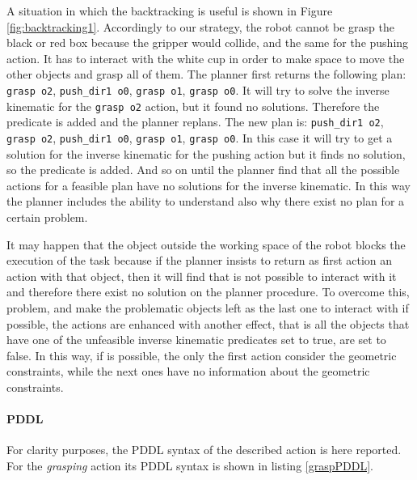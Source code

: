A situation in which the backtracking is useful is shown in Figure \ref{fig:backtracking1}. Accordingly to our strategy, the robot cannot be grasp the black or red box because the gripper would collide, and the same for the pushing action. It has to interact with the white cup in order to make space to move the other objects and grasp all of them. The planner first returns the following plan: \texttt{grasp o2}, \texttt{push\_dir1 o0}, \texttt{grasp o1}, \texttt{grasp o0}. It will try to solve the inverse kinematic for the \texttt{grasp o2} action, but it found no solutions. Therefore the predicate  is added and the planner replans. The new plan is: \texttt{push\_dir1 o2}, \texttt{grasp o2}, \texttt{push\_dir1 o0}, \texttt{grasp o1}, \texttt{grasp o0}. In this case it will try to get a solution for the inverse kinematic for the pushing action but it finds no solution, so the predicate  is added. And so on until the planner find that all the possible actions for a feasible plan have no solutions for the inverse kinematic. In this way the planner includes the ability to understand also why there exist no plan for a certain problem. 




It may happen that the object outside the working space of the robot blocks the execution of the task because if the planner insists to return as first action an action with that object, then it will find that is not possible to interact with it and therefore there exist no solution on the planner procedure. 
To overcome this, problem, and make the problematic objects left as the last one to interact with if possible, the actions are enhanced with another effect, that is all the objects that have one of the unfeasible inverse kinematic predicates set to true, are set to false. In this way, if is possible, the only the first action consider the geometric constraints, while the next ones have no information about the geometric constraints. 

\paragraph{PDDL}
For clarity purposes, the PDDL syntax of the described action is here reported. 
For the \textit{grasping} action its PDDL syntax is shown in listing \ref{graspPDDL}.


